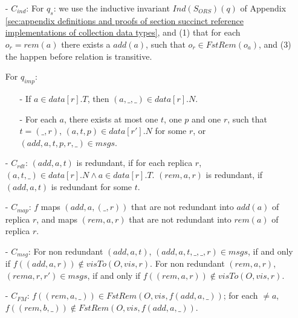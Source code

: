 \begin{itemize}
\setlength{\itemsep}{0.5pt}
\item[-] $C_{\mathit{ind}}$: For $q_s$: we use the inductive invariant $\mathit{Ind}(S_{\mathit{ORS}})(q)$ of Appendix \ref{sec:appendix definitions and proofs of section succinct reference implementations of collection data types}, and (1) that for each $o_r = \mathit{rem}(a)$ there exists a $\mathit{add}(a)$, such that $o_r \in \mathit{FstRem}(o_a)$, and (3) the happen before relation is transitive.

    For $q_{\mathit{imp}}$:

    \begin{itemize}
    \setlength{\itemsep}{0.5pt}
    \item[-] If $a \in \mathit{data}[r].T$, then $(a,\_,\_) \in \mathit{data}[r].N$.

    \item[-] For each $a$, there exists at most one $t$, one $p$ and one $r$, such that $t = (\_,r)$, $(a,t,p) \in \mathit{data}[r'].N$ for some $r$, or $(\mathit{add},a,t,p,r,\_) \in \mathit{msgs}$.

    \end{itemize}

\item[-] $C_{\mathit{rdt}}$: $(\mathit{add},a,t)$ is redundant, if for each replica $r$, $(a,t,\_) \in \mathit{data}[r].N \wedge a \in \mathit{data}[r].T$. $(\mathit{rem},a,r)$ is redundant, if $(\mathit{add},a,t)$ is redundant for some $t$.

\item[-] $C_{\mathit{map}}$: $f$ maps $(\mathit{add},a,(\_,r))$ that are not redundant into $\mathit{add}(a)$ of replica $r$, and maps $(\mathit{rem},a,r)$ that are not redundant into $\mathit{rem}(a)$ of replica $r$.

\item[-] $C_{\mathit{msg}}$: For non redundant $(\mathit{add},a,t)$, $(\mathit{add},a,t,\_,\_,r) \in \mathit{msgs}$, if and only if $f((\mathit{add},a,r)) \notin \mathit{visTo}(O,\mathit{vis},r)$. For non redundant $(\mathit{rem},a,r)$, $(\mathit{rem}a,r,r') \in \mathit{msgs}$, if and only if $f((\mathit{rem},a,r)) \notin \mathit{visTo}(O,\mathit{vis},r)$.

\item[-] $C_{\mathit{FM}}$: $f((\mathit{rem},a,\_)) \in \mathit{FstRem}(O,\mathit{vis},f( \mathit{add},a,\_ ))$; for each $ \neq a$, $f((\mathit{rem},b,\_)) \notin \mathit{FstRem}(O,\mathit{vis},f( \mathit{add},a,\_ ))$.


\end{itemize}
